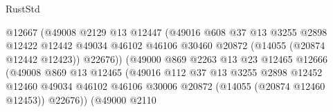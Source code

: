 \begin{lexlean}{RustStd}
\begin{coremodule}
                                            @12667
                                            (@49008
                                              @2129
                                              @13
                                              @12447
                                              (@49016
                                                @608
                                                @37
                                                @13
                                                @3255
                                                @2898
                                                @12422
                                                @12442
                                                @49034
                                                @46102
                                                @46106
                                                @30460
                                                @20872
                                                (@14055 (@20874 @12442 @12423))
                                                @22676))
                                            (@49000
                                              @869
                                              @2263
                                              @13
                                              @23
                                              @12465
                                              @12666
                                              (@49008
                                                @869
                                                @13
                                                @12465
                                                (@49016
                                                  @112
                                                  @37
                                                  @13
                                                  @3255
                                                  @2898
                                                  @12452
                                                  @12460
                                                  @49034
                                                  @46102
                                                  @46106
                                                  @30006
                                                  @20872
                                                  (@14055 (@20874 @12460 @12453))
                                                  @22676))
                                              (@49000
                                                @2110

\end{coremodule}
\end{lexlean}
